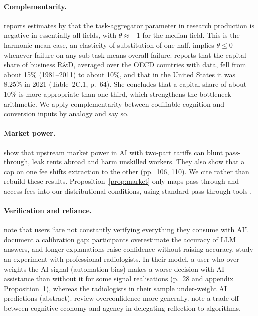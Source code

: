\documentclass[12pt]{article}
\theoremstyle{remark}
\begin{document}
\paragraph{Complementarity.} \citet[p.~55]{jones2026rd} reports estimates by \citet{ahmadpoor2019decoding} that the task-aggregator parameter in research production is negative in essentially all fields, with $\theta\approx-1$ for the median field. This is the harmonic-mean case, an elasticity of substitution of one half. \citet{kremer1993oring} implies $\theta\le0$ whenever failure on any sub-task means overall failure. \citet[pp.~63--64]{hall2026comment} reports that the capital share of business R\&D, averaged over the OECD countries with data, fell from about 15\% (1981--2011) to about 10\%, and that in the United States it was 8.25\% in 2021 (Table~2C.1, p.~64). She concludes that a capital share of about 10\% is more appropriate than one-third, which strengthens the bottleneck arithmetic. We apply complementarity between codifiable cognition and conversion inputs by analogy and say so.

\paragraph{Market power.} \citet{athey2026competition} show that upstream market power in AI with two-part tariffs can blunt pass-through, leak rents abroad and harm unskilled workers. They also show that a cap on one fee shifts extraction to the other (pp.~106, 110). We cite rather than rebuild these results. Proposition~\ref{prop:market} only maps pass-through and access fees into our distributional conditions, using standard pass-through tools \citep{weyl2013passthrough}.

\paragraph{Verification and reliance.} \citet[p.~383]{stiglitz2026information} note that users ``are not constantly verifying everything they consume with AI''. \citet{steyvers2025know} document a calibration gap: participants overestimate the accuracy of LLM answers, and longer explanations raise confidence without raising accuracy. \citet{agarwal2023radiology} study an experiment with professional radiologists. In their model, a user who over-weights the AI signal (automation bias) makes a worse decision with AI assistance than without it for some signal realisations (p.~28 and appendix Proposition~1), whereas the radiologists in their sample under-weight AI predictions (abstract). \citet{moore2008overconfidence} review overconfidence more generally. \citet[p.~277, fn.~6]{ludwig2026reflective} note a trade-off between cognitive economy and agency in delegating reflection to algorithms.
\end{document}
